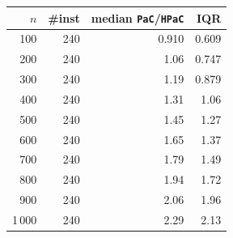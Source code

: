 \begin{tabular}{@{}rrrr@{}}
\toprule
$n$ & \#inst & median \texttt{PaC}/\texttt{HPaC} & IQR \\
\midrule
100 & 240 & 0.910 & 0.609 \\
200 & 240 & 1.06 & 0.747 \\
300 & 240 & 1.19 & 0.879 \\
400 & 240 & 1.31 & 1.06 \\
500 & 240 & 1.45 & 1.27 \\
600 & 240 & 1.65 & 1.37 \\
700 & 240 & 1.79 & 1.49 \\
800 & 240 & 1.94 & 1.72 \\
900 & 240 & 2.06 & 1.96 \\
1\,000 & 240 & 2.29 & 2.13 \\
\bottomrule
\end{tabular}
